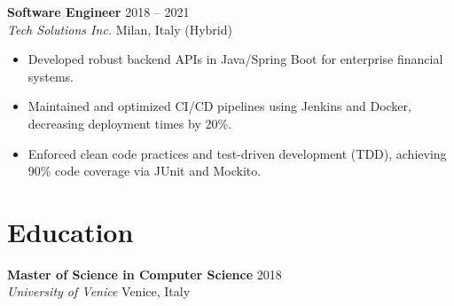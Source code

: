 \documentclass[11pt,a4paper]{article}
\begin{document}
\vspace{2mm}
\noindent
\textbf{Software Engineer} \hfill 2018 -- 2021 \\
\textit{Tech Solutions Inc.} \hfill Milan, Italy (Hybrid)
\begin{itemize}[leftmargin=*]
    \item Developed robust backend APIs in Java/Spring Boot for enterprise financial systems.
    \item Maintained and optimized CI/CD pipelines using Jenkins and Docker, decreasing deployment times by 20\%.
    \item Enforced clean code practices and test-driven development (TDD), achieving 90\% code coverage via JUnit and Mockito.
\end{itemize}

\section*{Education}
\noindent
\textbf{Master of Science in Computer Science} \hfill 2018 \\
\textit{University of Venice} \hfill Venice, Italy
\end{document}
